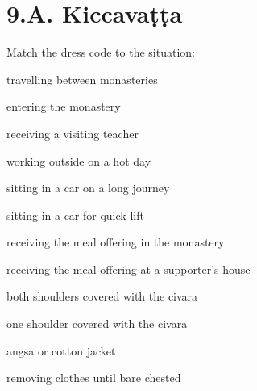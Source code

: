 \chapter{9.A. Kiccavaṭṭa}
\renewcommand*{\theChapterTitle}{9.A. Kiccavaṭṭa}

\begin{exam}{\autoExamName}

\begin{problem*}

  Match the dress code to the situation:

  \bigskip

  \begin{multicols}{2}

    \begin{parts}

    \item \fillin{2cm}{\ref{both}} travelling between monasteries
    \item \fillin{2cm}{\ref{one}} entering the monastery
    \item \fillin{2cm}{\ref{one}} receiving a visiting teacher
    \item \fillin{2cm}{\ref{angsa}} working outside on a hot day
    \item \fillin{2cm}{\ref{both}} sitting in a car on a long journey
    \item \fillin{2cm}{\ref{both}} sitting in a car for quick lift
    \item \fillin{2cm}{\ref{one}} receiving the meal offering in the monastery
    \item \fillin{2cm}{\ref{both}} receiving the meal offering at a supporter's house

    \columnbreak

    \bMatchChoices

    \item\label{both} both shoulders covered with the civara
    \item\label{one} one shoulder covered with the civara
    \item\label{angsa} angsa or cotton jacket
    \item\label{bare} removing clothes until bare chested

    \eMatchChoices

    \end{parts}
  
  \end{multicols}

\end{problem*}


\end{exam}
